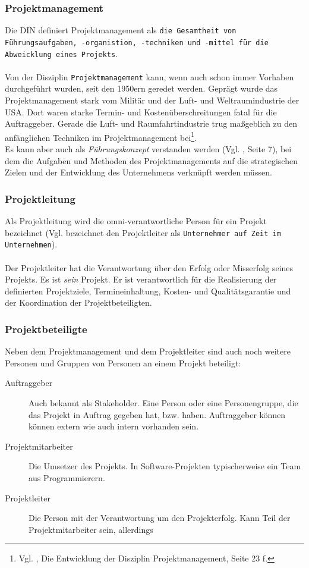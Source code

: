 \documentclass[12pt]{scrartcl}
\begin{document}
\subsubsection{Projektmanagement}
Die DIN definiert Projektmanagement als \texttt{die Gesamtheit von Führungsaufgaben, -organistion, -techniken und -mittel für die Abweicklung eines Projekts}.\\
\\
Von der Disziplin \texttt{Projektmanagement} kann, wenn auch schon immer Vorhaben durchgeführt wurden, seit den 1950ern geredet werden. Geprägt wurde das Projektmanagement stark vom Militär und der Luft- und Weltraumindustrie der USA. Dort waren starke Termin- und Kostenüberschreitungen fatal für die Auftraggeber. Gerade die Luft- und Raumfahrtindustrie trug maßgeblich zu den anfänglichen Techniken im Projektmanagement bei\footnote{Vgl. \cite{proj_zum_erfolg_fuehren}, Die Entwicklung der Disziplin Projektmanagement, Seite 23 f.}. 
\\
Es kann aber auch als \textit{Führungskonzept} verstanden werden (Vgl. \cite{scriptPM}, Seite 7), bei dem die Aufgaben und Methoden des Projektmanagements auf die strategischen Zielen und der Entwicklung des Unternehmens verknüpft werden müssen. 

\subsubsection{Projektleitung}
Als Projektleitung wird die omni-verantwortliche Person für ein Projekt bezeichnet (Vgl. \cite{proj_zum_erfolg_fuehren} bezeichnet den Projektleiter als \texttt{Unternehmer auf Zeit im Unternehmen}). \\
\\
Der Projektleiter hat die Verantwortung über den Erfolg oder Misserfolg seines Projekts. Es ist \textit{sein} Projekt. Er ist verantwortlich für die Realisierung der definierten Projektziele, Termineinhaltung, Kosten- und Qualitätsgarantie und der Koordination der Projektbeteiligten. 

\subsubsection{Projektbeteiligte}
Neben dem Projektmanagement und dem Projektleiter sind auch noch weitere Personen und Gruppen von Personen an einem Projekt beteiligt:
\begin{description}
    \item[Auftraggeber]
    Auch bekannt als Stakeholder. Eine Person oder eine Personengruppe, die das Projekt in Auftrag gegeben hat, bzw. haben. Auftraggeber können können extern wie auch intern vorhanden sein.
    
    \item[Projektmitarbeiter]
    Die Umsetzer des Projekts. In Software-Projekten typischerweise ein Team aus Programmierern.
    
    \item[Projektleiter]
    Die Person mit der Verantwortung um den Projekterfolg. Kann Teil der Projektmitarbeiter sein, allerdings
\end{description}
\end{document}
